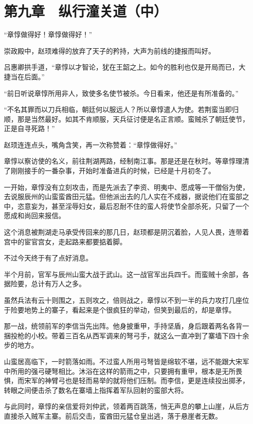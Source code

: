 \section{第九章　纵行潼关道（中）}

“章惇做得好！章惇做得好！”

崇政殿中，赵顼难得的放弃了天子的矜持，大声为前线的捷报而叫好。

吕惠卿拱手道，“章惇以才智论，犹在王韶之上。如今的胜利也仅是开局而已，大捷当在后面。”

“前日听说章惇所用非人，致使多名使节被杀。今日看来，他还是有所准备的。”

“不名其罪而以刀兵相临，朝廷何以服远人？所以章惇遣人为使。若荆蛮当即归顺，那是当然最好。如其不肯顺服，天兵征讨便是名正言顺。蛮贼杀了朝廷使节，正是自寻死路！”

赵顼连连点头，嘴角含笑，再一次称赞着：“章惇做得好。”

章惇以察访使的名义，前往荆湖两路，经制南江事。那是还是在秋时。等章惇理清了刚刚接手的一番杂事，开始时准备进兵的时候，已经是十月初冬了。

一开始，章惇没有立刻攻击，而是先派去了李资、明夷中、愿成等一干僧俗为使，去说服辰州的山蛮蛮酋田元猛。但他派出去的几人实在不成器，据说他们在蛮部之中，恣意妄为，甚至淫辱妇女，最后忍耐不住的蛮人将使节全部杀死，只留了一个愿成和尚回来报信。

这个消息被荆湖走马承受传回来的那几日，赵顼都是阴沉着脸，人见人畏，连带着宫中的宦官宫女，走起路来都要掂着脚。

不过今天终于有了点好消息。

半个月前，官军与辰州山蛮大战于武山。这一战官军出兵四千。而蛮贼十余部，各据险要，总计有万人之多。

虽然兵法有云十则围之，五则攻之，倍则战之，章惇以不到一半的兵力攻打几座位于险要地势上的寨子，看起来是个很疯狂的举动，但笑到最后的，却是章惇。

那一战，统领前军的李信当先出阵。他身披重甲，手持坚盾，身后跟着两名各背一捆投枪的小校。带着三百名从西军调来的弩弓手，就这么一直冲到了寨墙下四十余步的地方。

山蛮居高临下，一时箭落如雨。不过蛮人所用弓弩皆是绵软不堪，远不能跟大宋军中所用的强弓硬弩相比。沐浴在这样的箭雨之中，只要拥有重甲，根本是无所畏惧，而宋军的神臂弓也是轻而易举的就将他们压制。而李信，更是连续投出掷矛，转眼之间便击杀了数名在寨墙上指挥着军队回射的蛮部大将。

与此同时，章惇的亲信爱将刘仲武，领着两百跳荡，悄无声息的攀上山崖，从后方直接杀入贼军主寨。前后交击，蛮酋田元猛仓皇出逃，落于悬崖者无数。

